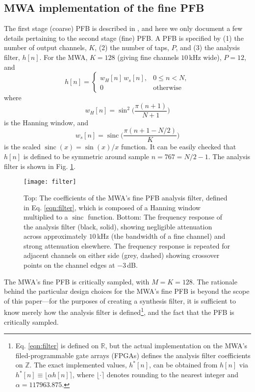 \documentclass{pasa}%
\DeclareMathOperator{\sinc}{sinc}
\begin{document}
\subsection{MWA implementation of the fine PFB}
\label{sec:mwa_pfb}

The first stage (coarse) PFB is described in \citet{Prabu2015}, and here we only document a few details pertaining to the second stage (fine) PFB.
A PFB is specified by (1) the number of output channels, $K$, (2) the number of taps, $P$, and (3) the analysis filter, $h[n]$.
For the MWA, $K = 128$ (giving fine channels $10\,$kHz wide), $P = 12$, and
\begin{equation}
    h[n] =
        \begin{cases}
            w_H[n]\,w_s[n], & 0 \le n < N, \\
            0               & \text{otherwise}
        \end{cases}
    \label{eqn:filter}
\end{equation}
where
\begin{equation*}
    w_H[n] = \sin^2\bigg(\frac{\pi (n+1)}{N+1}\bigg)
\end{equation*}
is the Hanning window, and
\begin{equation*}
    w_s[n] = \sinc\bigg(\frac{\pi(n + 1 - N/2)}{K}\bigg)
\end{equation*}
is the scaled $\sinc(x) = \sin(x)/x$ function.
It can be easily checked that $h[n]$ is defined to be symmetric around sample $n = 767 = N/2-1$.
The analysis filter is shown in Fig. \ref{fig:filter}.
\begin{figure}[t]
    \centering
    \texttt{[image: filter]}
    \caption{Top: The coefficients of the MWA's fine PFB analysis filter, defined in Eq. \eqref{eqn:filter}, which is composed of a Hanning window multiplied to a $\sinc$ function. Bottom: The frequency response of the analysis filter (black, solid), showing negligible attenuation across approximately $10\,$kHz (the bandwidth of a fine channel) and strong attenuation elsewhere. The frequency response is repeated for adjacent channels on either side (grey, dashed) showing crossover points on the channel edges at $-3\,$dB.}
    \label{fig:filter}
\end{figure}
The MWA's fine PFB is critically sampled, with $M = K = 128$.
The rationale behind the particular design choices for the MWA's fine PFB is beyond the scope of this paper---for the purposes of creating a synthesis filter, it is sufficient to know merely how the analysis filter is defined\footnote{Eq. \eqref{eqn:filter} is defined on $\mathbb{R}$, but the actual implementation on the MWA's filed-programmable gate arrays (FPGAs) defines the analysis filter coefficients on $\mathbb{Z}$. The exact implemented values, $h^\ast[n]$, can be obtained from $h[n]$ via $h^\ast[n] \equiv \lfloor\alpha h[n]\rceil$, where $\lfloor\cdot\rceil$ denotes rounding to the nearest integer and $\alpha = 117963.875$.}, and the fact that the PFB is critically sampled.
\end{document}
